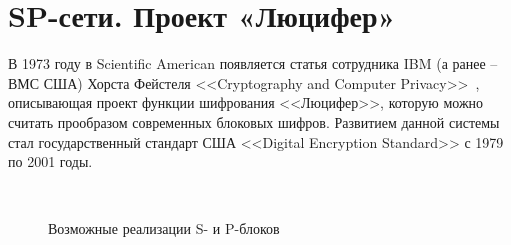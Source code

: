 \section{SP-сети. Проект «Люцифер»}\label{project-lucifer}

В 1973 году  в Scientific American появляется статья сотрудника IBM (а ранее -- ВМС США) Хорста Фейстеля <<Cryptography and Computer Privacy>>~\cite{Feistel:1973}, описывающая проект функции шифрования <<Люцифер>>, которую можно считать прообразом современных блоковых шифров. Развитием данной системы стал государственный стандарт США <<Digital Encryption Standard>> с 1979 по 2001 годы.

\begin{figure}[!t]
    \centering
    ~~~
		\caption{Возможные реализации S- и P-блоков}
\end{figure}

